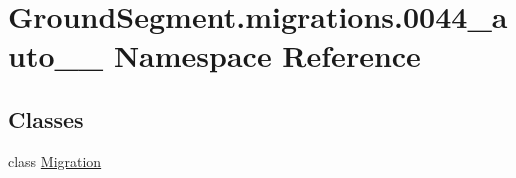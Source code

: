 \hypertarget{namespace_ground_segment_1_1migrations_1_10044__auto__20170206__1250}{}\section{Ground\+Segment.\+migrations.0044\+\_\+auto\+\_\+\_ Namespace Reference}
\label{namespace_ground_segment_1_1migrations_1_10044__auto__20170206__1250}
\subsection*{Classes}
\begin{DoxyCompactItemize}
\item 
class \hyperlink{class_ground_segment_1_1migrations_1_10044__auto__20170206__1250_1_1_migration}{Migration}
\end{DoxyCompactItemize}
